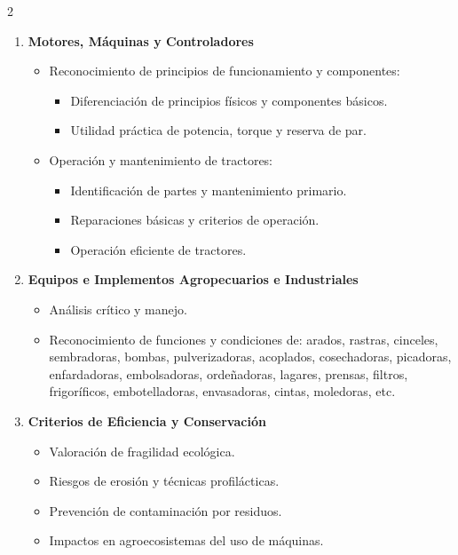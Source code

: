 \begin{multicols}{2}

\begin{enumerate}
\item \textbf{Motores, Máquinas y Controladores}
    \begin{itemize}
        \item Reconocimiento de principios de funcionamiento y componentes:
        \begin{itemize}
            \item Diferenciación de principios físicos y componentes básicos.
            \item Utilidad práctica de potencia, torque y reserva de par.
        \end{itemize}
        \item Operación y mantenimiento de tractores:
        \begin{itemize}
            \item Identificación de partes y mantenimiento primario.
            \item Reparaciones básicas y criterios de operación.
            \item Operación eficiente de tractores.
        \end{itemize}
    \end{itemize}

\item \textbf{Equipos e Implementos Agropecuarios e Industriales}
    \begin{itemize}
        \item Análisis crítico y manejo.
        \item Reconocimiento de funciones y condiciones de: arados, rastras, cinceles, sembradoras, bombas, pulverizadoras, acoplados, cosechadoras, picadoras, enfardadoras, embolsadoras, ordeñadoras, lagares, prensas, filtros, frigoríficos, embotelladoras, envasadoras, cintas, moledoras, etc.
    \end{itemize}

\item \textbf{Criterios de Eficiencia y Conservación}
    \begin{itemize}
        \item Valoración de fragilidad ecológica.
        \item Riesgos de erosión y técnicas profilácticas.
        \item Prevención de contaminación por residuos.
        \item Impactos en agroecosistemas del uso de máquinas.
    \end{itemize}
\end{enumerate}

\end{multicols}

